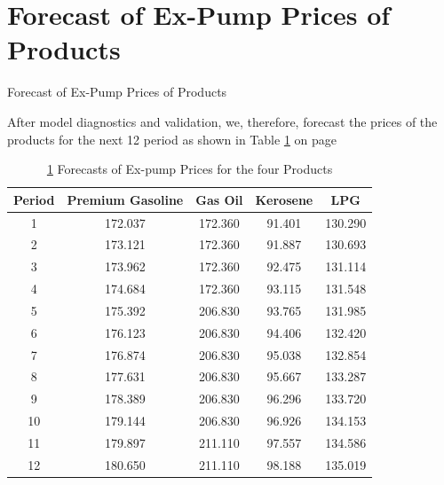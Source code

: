 \documentclass{beamer}
\newcommand{\vspaceTen}{\vspace{10pt}}
\begin{document}
	\section{Forecast of Ex-Pump Prices of Products}
	\begin{frame}{Forecast of Ex-Pump Prices of Products}
		\begin{block}{}
			\vspaceTen
			After model diagnostics and validation, we, therefore, forecast the prices of the products for the next 12 period as shown in Table \ref{table:forecast} on page \pageref{table:forecast}
			\vspaceTen
		\end{block}
	\end{frame}
	\begin{frame}
		\begin{table}
			\caption{ \ref{table:forecast} Forecasts of Ex-pump Prices for the four Products}
			\label{table:forecast}
			
			\begin{tabular}{ccccc}
				\toprule
				Period & Premium Gasoline & Gas Oil & Kerosene & LPG \\
				\midrule
				
				1 & 172.037 & 172.360 & 91.401 & 130.290 \\
				2 & 173.121 & 172.360 & 91.887 & 130.693 \\
				3 & 173.962 & 172.360 & 92.475 & 131.114 \\
				4 & 174.684 & 172.360 & 93.115 & 131.548 \\
				5 & 175.392 & 206.830 & 93.765 & 131.985 \\
				6 & 176.123 & 206.830 & 94.406 & 132.420 \\
				7 & 176.874 & 206.830 & 95.038 & 132.854 \\
				8 & 177.631 & 206.830 & 95.667 & 133.287 \\
				9 & 178.389 & 206.830 & 96.296 & 133.720 \\
				10 & 179.144 & 206.830 & 96.926 & 134.153 \\
				11 & 179.897 & 211.110 & 97.557 & 134.586 \\
				12 & 180.650 & 211.110 & 98.188 & 135.019 \\
				
				\bottomrule
			\end{tabular}
		\end{table}
		
	\end{frame}
\end{document}
